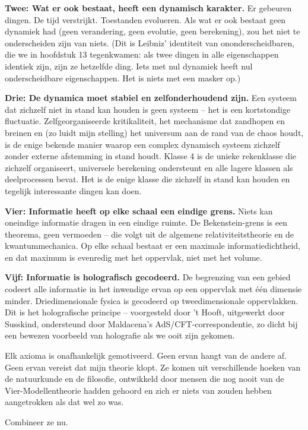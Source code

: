 \documentclass[11pt, twoside, openright]{book}
\begin{document}
\textbf{Twee: Wat er ook bestaat, heeft een dynamisch karakter.} Er gebeuren dingen. De tijd verstrijkt. Toestanden evolueren. Als wat er ook bestaat geen dynamiek had (geen verandering, geen evolutie, geen berekening), zou het niet te onderscheiden zijn van niets. (Dit is Leibniz' identiteit van ononderscheidbaren, die we in hoofdstuk 13 tegenkwamen: als twee dingen in alle eigenschappen identiek zijn, zijn ze hetzelfde ding. Iets met nul dynamiek heeft nul onderscheidbare eigenschappen. Het is niets met een masker op.)

\textbf{Drie: De dynamica moet stabiel en zelfonderhoudend zijn.} Een systeem dat zichzelf niet in stand kan houden is geen systeem -- het is een kortstondige fluctuatie. Zelfgeorganiseerde kritikaliteit, het mechanisme dat zandhopen en breinen en (zo luidt mijn stelling) het universum aan de rand van de chaos houdt, is de enige bekende manier waarop een complex dynamisch systeem zichzelf zonder externe afstemming in stand houdt. Klasse 4 is de unieke rekenklasse die zichzelf organiseert, universele berekening ondersteunt en alle lagere klassen als deelprocessen bevat. Het is de enige klasse die zichzelf in stand kan houden en tegelijk interessante dingen kan doen.

\textbf{Vier: Informatie heeft op elke schaal een eindige grens.} Niets kan oneindige informatie dragen in een eindige ruimte. De Bekenstein-grens is een theorema, geen vermoeden -- die volgt uit de algemene relativiteitstheorie en de kwantummechanica. Op elke schaal bestaat er een maximale informatiedichtheid, en dat maximum is evenredig met het oppervlak, niet met het volume.

\textbf{Vijf: Informatie is holografisch gecodeerd.} De begrenzing van een gebied codeert alle informatie in het inwendige ervan op een oppervlak met één dimensie minder. Driedimensionale fysica is gecodeerd op tweedimensionale oppervlakken. Dit is het holografische principe -- voorgesteld door 't Hooft, uitgewerkt door Susskind, ondersteund door Maldacena's AdS/\allowbreak{}CFT-correspondentie, zo dicht bij een bewezen voorbeeld van holografie als we ooit zijn gekomen.

Elk axioma is onafhankelijk gemotiveerd. Geen ervan hangt van de andere af. Geen ervan vereist dat mijn theorie klopt. Ze komen uit verschillende hoeken van de natuurkunde en de filosofie, ontwikkeld door mensen die nog nooit van de Vier-Modellentheorie hadden gehoord en zich er niets van zouden hebben aangetrokken als dat wel zo was.

Combineer ze nu.
\end{document}
